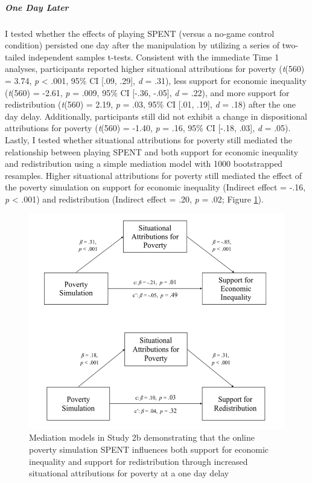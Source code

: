 \documentclass{sfuthesis}
\begin{document}
\subparagraph{One Day Later} I tested whether the effects of playing SPENT (versus a no-game control condition) persisted one day after the manipulation by utilizing a series of two-tailed independent samples t-tests. Consistent with the immediate Time 1 analyses, participants reported higher situational attributions for poverty (\textit{t}(560) = 3.74, \textit{p} < .001, 95\% CI [.09, .29],  \textit{d} = .31), less support for economic inequality (\textit{t}(560) = -2.61, \textit{p} = .009, 95\% CI [-.36, -.05], \textit{d} = .22), and more support for redistribution (\textit{t}(560) = 2.19, \textit{p} = .03, 95\% CI [.01, .19], \textit{d} = .18) after the one day delay. Additionally, participants still did not exhibit a change in dispositional attributions for poverty (\textit{t}(560) = -1.40, \textit{p} = .16, 95\% CI [-.18, .03], \textit{d} = .05). Lastly, I tested whether situational attributions for poverty still mediated the relationship between playing SPENT and both support for economic inequality and redistribution using a simple mediation model with 1000 bootstrapped resamples. Higher situational attributions for poverty still mediated the effect of the poverty simulation on support for economic inequality (Indirect effect = -.16, \textit{p} < .001) and redistribution (Indirect effect = .20, \textit{p} = .02; Figure \ref{fig:fourthfig}).

\begin{figure}[h]
  \includegraphics[width=\linewidth]{Fig3-2.png}
  \caption{Mediation models in Study 2b demonstrating that the online poverty simulation SPENT influences both support for economic inequality and support for redistribution through increased situational attributions for poverty at a one day delay}
  \label{fig:fourthfig}
\end{figure}
\end{document}
